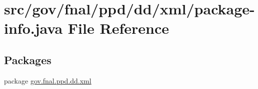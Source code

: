 \hypertarget{gov_2fnal_2ppd_2dd_2xml_2package-info_8java}{\section{src/gov/fnal/ppd/dd/xml/package-\/info.java File Reference}
\label{gov_2fnal_2ppd_2dd_2xml_2package-info_8java}
}
\subsection*{Packages}
\begin{DoxyCompactItemize}
\item 
package \hyperlink{namespacegov_1_1fnal_1_1ppd_1_1dd_1_1xml}{gov.\-fnal.\-ppd.\-dd.\-xml}
\end{DoxyCompactItemize}
